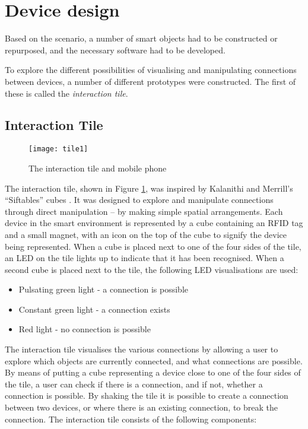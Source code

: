 \section{Device design}
\label{DeviceDesign1}

Based on the scenario, a number of smart objects had to be constructed or repurposed, and the necessary software had to be developed.

To explore the different possibilities of visualising and manipulating connections between devices, a number of different prototypes were constructed. The first of these is called the \emph{interaction tile}. 



\subsection{Interaction Tile}
\label{InteractionTile}

\begin{figure}[bth]
\centering
\texttt{[image: tile1]}
\caption{The interaction tile and mobile phone}
\label{tile1}
\end{figure}

The interaction tile, shown in Figure \ref{tile1}, was inspired by Kala\-nithi and Merrill's ``Siftables'' cubes \cite{Merrill2007}. It was designed to explore and manipulate connections through direct manipulation -- by making simple spatial arrangements. Each device in the smart environment is represented by a cube containing an \ac{RFID} tag and a small magnet, with an icon on the top of the cube to signify the device being represented. When a cube is placed next to one of the four sides of the tile, an LED on the tile lights up to indicate that it has been recognised. When a second cube is placed next to the tile, the following LED visualisations are used:

\begin{itemize}
	\item Pulsating green light - a connection is possible
	\item Constant green light - a connection exists
	\item Red light - no connection is possible
\end{itemize}  

The interaction tile visualises the various connections by allowing a user to explore which objects are currently connected, and what connections are possible. By means of putting a cube representing a device close to one of the four sides of the tile, a user can check if there is a connection, and if not, whether a connection is possible. By shaking the tile it is possible to create a connection between two devices, or where there is an existing connection, to break the connection. The interaction tile consists of the following components:


